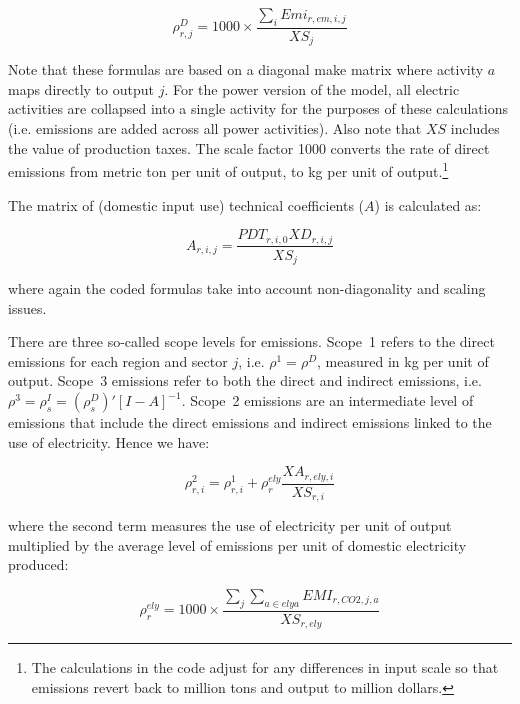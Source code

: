 \documentclass[11pt,letterpaper]{report}
\begin{document}
\[
\rho^D_{r,j} = 1000 \times \frac{\sum_i \mathit{Emi}_{r,\mathit{em},i,\mathit{j}}} {\mathit{XS}_j}
\]

\noindent Note that these formulas are based on a diagonal make matrix where activity $a$ maps directly to output $j$.
For the power version of the model, all electric activities are collapsed into a single activity for the
purposes of these calculations (i.e. emissions are added across all power activities). Also note
that $\mathit{XS}$ includes the value of production taxes. The scale factor 1000 converts the
rate of direct emissions from metric ton per unit of output, to kg per unit of output.\footnote{The
calculations in the code adjust for any differences in input scale so that emissions revert back
to million tons and output to million dollars.}

The matrix of (domestic input use) technical coefficients ($A$) is calculated as:

\[
A_{r,i,j} = \frac{\mathit{PDT}_{r,i,0} \mathit{XD}_{r,i,\mathit{j}} }{\mathit{XS}_j}
\]

\noindent where again the coded formulas take into account non-diagonality and scaling issues.

There are three so-called scope levels for emissions.
Scope~1 refers to the direct emissions for each
region and sector $j$, i.e. $\rho^1 = \rho^D$, measured
in kg per unit of output.
Scope~3 emissions refer to both the direct and
indirect emissions, i.e. $\rho^3 = \rho^I_s = \left(\rho^D_s\right)'\left[I-A\right]^{-1}$.
Scope~2 emissions are an intermediate level of
emissions that include the direct emissions and
indirect emissions linked to the use of electricity.
Hence we have:

\[
\rho^2_{r,i} = \rho^1_{r,i}
+ \rho^{\mathit{ely}}_{r} \frac{\mathit{XA}_{r,\mathit{ely},i}}{\mathit{XS}_{r,i}}
\]

\noindent where the second term measures the use of
electricity per unit of output multiplied by the
average level of emissions per unit of domestic electricity
produced:

\[
\rho^{\mathit{ely}}_{r}
= 1000 \times \frac{\sum_j{\sum_{a \in {\mathit{elya}}}{\mathit{EMI}_{r,\mathit{CO2},j,a}}}}
{\mathit{XS}_{\mathit{r,ely}}}
\]

\end{document}
